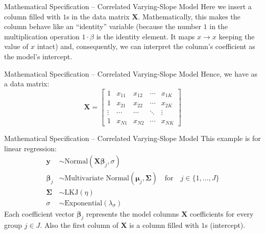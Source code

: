 \begin{frame}{Mathematical Specification -- Correlated Varying-Slope Model}
	Here we insert a column filled with $1$s in the data matrix $\mathbf{X}$.
	\vfill
	Mathematically, this makes the column behave like an ``identity'' variable
	(because the number $1$ in the multiplication operation $1 \cdot \beta$ is the identity element.
	It maps $x \to x$ keeping the value of $x$ intact) and, consequently,
	we can interpret the column's coefficient as the model's intercept.
\end{frame}

\begin{frame}{Mathematical Specification -- Correlated Varying-Slope Model}
	Hence, we have as a data matrix:
	$$
		\mathbf{X} =
		\begin{bmatrix}
			1      & x_{11} & x_{12} & \cdots & x_{1K} \\
			1      & x_{21} & x_{22} & \cdots & x_{2K} \\
			\vdots & \cdots & \cdots & \ddots & \vdots \\
			1      & x_{N1} & x_{N2} & \cdots & x_{NK}
		\end{bmatrix}
	$$
\end{frame}

\begin{frame}{Mathematical Specification -- Correlated Varying-Slope Model}
	This example is for linear regression:
	$$
		\begin{aligned}
			\mathbf{y}           & \sim \text{Normal}(\mathbf{X} \boldsymbol{\beta}_{j}, \sigma)            \\
			\boldsymbol{\beta}_j & \sim \text{Multivariate Normal}(\boldsymbol{\mu}_j, \boldsymbol{\Sigma})
			\quad \text{for}\quad j \in \{ 1, \dots, J \}                                                   \\
			\boldsymbol{\Sigma}  & \sim \text{LKJ}(\eta)                                                    \\
			\sigma               & \sim \text{Exponential}(\lambda_\sigma)
		\end{aligned}
	$$
	Each coefficient vector $\boldsymbol{\beta}_j$ represents the
	model columns $\mathbf{X}$ coefficients for every group $j \in J$.
	Also the first column of $\mathbf{X}$ is a column filled with $1$s
	(intercept).
\end{frame}

